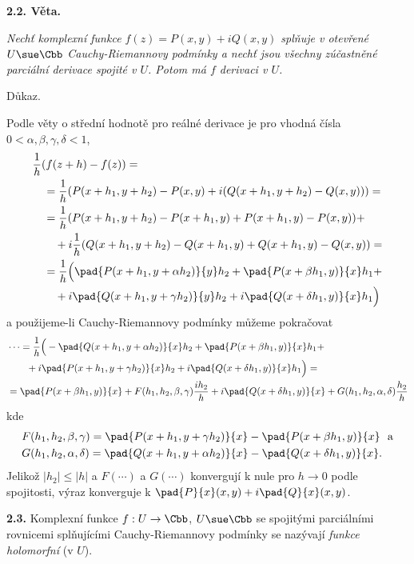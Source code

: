 \documentclass[12pt]{article}
\begin{document}
 {\bf 2.2. Věta.} {\em Nechť komplexní funkce $f(z)=P(x,y)+iQ(x,y)$ splňuje v otevřené $U\sue\Cbb$  Cauchy-Riemannovy podmínky a nechť jsou všechny zúčastněné parciální derivace  spojité v $U$. Potom má $f$ derivaci v  $U$.
 
 Důkaz.} Podle věty o střední hodnotě pro reálné derivace  je pro vhodná čísla $0<\alpha,\beta,\gamma,\delta<1$,
 $$
 \begin{aligned}
 &\frac1h(f(z+h)-f(z))=\\
 &\quad=\frac1h(P(x+h_1,y+h_2)-P(x,y)+i(Q(x+h_1,y+h_2)-Q(x,y)))=\\
 &\quad=\frac1h(P(x+h_1,y+h_2)-P(x+h_1,y)+P(x+h_1,y)-P(x,y))+\\
 &\quad\quad +i\frac1h(Q(x+h_1,y+h_2)-Q(x+h_1,y)+Q(x+h_1,y)-Q(x,y))=\\
 &\quad=\frac1h\Big(\pad{P(x+h_1,y+\alpha h_2)}{y}h_2+\pad{P(x+\beta h_1,y)}{x}h_1 +\\
 &\quad\quad+
 i\pad{Q(x+h_1,y+\gamma h_2)}{y}h_2+i\pad{Q(x+\delta h_1,y)}{x}h_1 \Big)
 \end{aligned}
 $$
 a použijeme-li Cauchy-Riemannovy podmínky můžeme pokračovat
 $$
 \begin{aligned} 
 &\dots=\frac1h\Big(-\pad{Q(x+h_1,y+\alpha h_2)}{x}h_2+\pad{P(x+\beta h_1,y)}{x}h_1 +\\
 &\quad\quad+
 i\pad{P(x+h_1,y+\gamma h_2)}{x}h_2+i\pad{Q(x+\delta h_1,y)}{x}h_1 \Big)=\\
 &=\pad{P(x+\beta h_1,y)}{x}+F(h_1,h_2,\beta,\gamma)\frac{i h_2}{h}+
 i\pad{Q(x+\delta h_1,y)}{x}+G(h_1,h_2,\alpha,\delta)\frac{h_2}{h} 
 \end{aligned}
 $$
kde
 $$
 \begin{aligned}
 &F(h_1,h_2,\beta,\gamma)=\pad{P(x+h_1,y+\gamma h_2)}{x}-\pad{P(x+\beta h_1,y)}{x}\ \ \text{a}\\
 &G(h_1,h_2,\alpha,\delta)=\pad{Q(x+h_1,y+\alpha h_2)}{x}-\pad{Q(x+\delta h_1,y)}{x}.
 \end{aligned}
 $$
 Jelikož $|h_2|\leq|h|$ a $F(\cdots)$ a  $G(\cdots)$ konvergují k nule  pro $h\to 0$ podle spojitosti, výraz konverguje k $\pad{P}{x}(x,y)+i\pad{Q}{x}(x,y)$.\sq
 
 \bigskip
 
 {\bf 2.3.} Komplexní funkce $f:U\to\Cbb$, $U\sue\Cbb$ se spojitými parciálními rovnicemi splňujícími   Cauchy-Riemannovy podmínky se nazývají  {\em funkce holomorfní} (v $U$).

 \vskip10mm

\newpage
 
\end{document}

